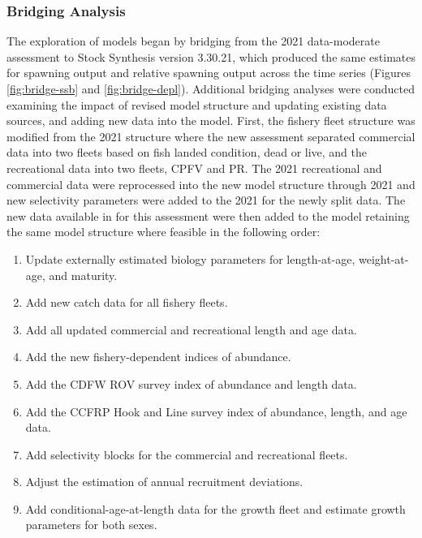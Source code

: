 \documentclass[11pt,
  letterpaper,
]{article}
\begin{document}
\subsubsection{Bridging Analysis}\label{bridging-analysis}

The exploration of models began by bridging from the 2021 data-moderate assessment to Stock Synthesis version 3.30.21, which produced the same estimates for spawning output and relative spawning output across the time series (Figures \ref{fig:bridge-ssb} and \ref{fig:bridge-depl}). Additional bridging analyses were conducted examining the impact of revised model structure and updating existing data sources, and adding new data into the model. First, the fishery fleet structure was modified from the 2021 structure where the new assessment separated commercial data into two fleets based on fish landed condition, dead or live, and the recreational data into two fleets, CPFV and PR. The 2021 recreational and commercial data were reprocessed into the new model structure through 2021 and new selectivity parameters were added to the 2021 for the newly split data. The new data available in for this assessment were then added to the model retaining the same model structure where feasible in the following order:

\begin{enumerate}
    \item Update externally estimated biology parameters for length-at-age, weight-at-age, and maturity.
    \item Add new catch data for all fishery fleets.
    \item Add all updated commercial and recreational length and age data.
    \item Add the new fishery-dependent indices of abundance.
    \item Add the CDFW ROV survey index of abundance and length data.
    \item Add the CCFRP Hook and Line survey index of abundance, length, and age data.
    \item Add selectivity blocks for the commercial and recreational fleets.
    \item Adjust the estimation of annual recruitment deviations.
    \item Add conditional-age-at-length data for the growth fleet and estimate growth parameters for both sexes.
\end{enumerate}
\end{document}
